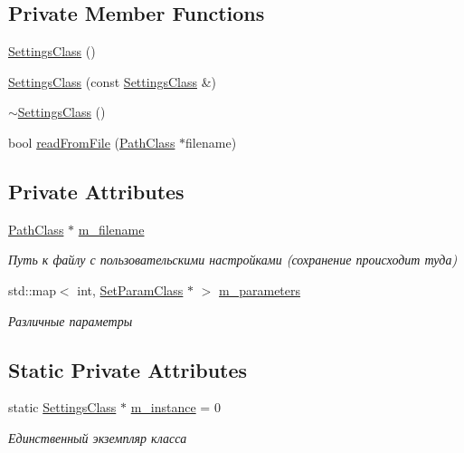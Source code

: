 \subsection*{Private Member Functions}
\begin{DoxyCompactItemize}
\item 
\hyperlink{class_settings_class_af31d302d74918e3277b0eec4179fe955}{Settings\+Class} ()
\item 
\hyperlink{class_settings_class_a58d60ce6bc87f24e95ead1fee4179f61}{Settings\+Class} (const \hyperlink{class_settings_class}{Settings\+Class} \&)
\item 
\hyperlink{class_settings_class_a8bc9410c9e549dc88296beedaabc13d0}{$\sim$\+Settings\+Class} ()
\item 
bool \hyperlink{class_settings_class_a310b7327477778d8289439d62312b6ad}{read\+From\+File} (\hyperlink{class_path_class}{Path\+Class} $\ast$filename)
\end{DoxyCompactItemize}
\subsection*{Private Attributes}
\begin{DoxyCompactItemize}
\item 
\hyperlink{class_path_class}{Path\+Class} $\ast$ \hyperlink{class_settings_class_a3d3c133782d86998758c217166099a4b}{m\+\_\+filename}
\begin{DoxyCompactList}\small\item\em Путь к файлу с пользовательскими настройками (сохранение происходит туда) \end{DoxyCompactList}\item 
std\+::map$<$ int, \hyperlink{class_set_param_class}{Set\+Param\+Class} $\ast$ $>$ \hyperlink{class_settings_class_ac36de25456667eac63fa41a643dbdc92}{m\+\_\+parameters}
\begin{DoxyCompactList}\small\item\em Различные параметры \end{DoxyCompactList}\end{DoxyCompactItemize}
\subsection*{Static Private Attributes}
\begin{DoxyCompactItemize}
\item 
static \hyperlink{class_settings_class}{Settings\+Class} $\ast$ \hyperlink{class_settings_class_a42dc072ae3d60214386ca189003d92fb}{m\+\_\+instance} = 0
\begin{DoxyCompactList}\small\item\em Единственный экземпляр класса \end{DoxyCompactList}\end{DoxyCompactItemize}


